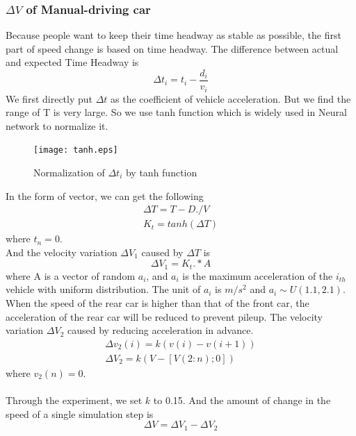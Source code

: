 \documentclass[UTF8]{mcmthesis}
\begin{document}
\subsubsection{$\Delta V$ of Manual-driving car}
Because people want to keep their time headway as stable as possible, the first part of speed change is based on time headway. The difference between actual and expected Time Headway is
\begin{equation}
	\Delta t_{i}=t_{i}-\frac{d_{i}}{v_{i}}
\end{equation}
\indent We first directly put $\Delta t$ as the coefficient of vehicle acceleration. But we find the range of T is very large. So we use tanh function which is widely used in Neural network to normalize it.\\
\begin{figure}[H]
	\centerline{\texttt{[image: tanh.eps]}}
	\caption{Normalization of $\Delta t_{i}$ by tanh function}
\end{figure}
\indent In the form of vector, we can get the following
\begin{equation}
\begin{split}
	\Delta T=T-D./V\\
	K_{t}= tanh(\Delta T) 
\end{split}
\end{equation}
where $t_n=0$.\\
\indent And the velocity variation $\Delta V_{1}$ caused by $\Delta T$ is
\begin{equation}
	\Delta V_{1}=K_{t}.*A
\end{equation}
\indent where A is a vector of random $a_{i}$, and $a_{i}$ is the maximum acceleration of the $i_{th}$ vehicle with uniform distribution. The unit of $a_{i}$ is $m/s^{2}$ and $a_{i}\sim U(1.1,2.1)$.\\
\indent When the speed of the rear car is higher than that of the front car, the acceleration of the rear car will be reduced to prevent pileup. The velocity variation $\Delta V_{2}$ caused by reducing acceleration in advance.
\begin{equation}
\begin{split}
	\Delta v_{2}(i)=k(v(i)-v(i+1))\\
	\Delta V_{2}=k(V-[V(2:n);0])
\end{split}
\end{equation}
where $v_2(n)=0$.\\
\\Through the experiment, we set $k$ to 0.15. And the amount of change in the speed of a single simulation step is
\begin{equation}
\Delta V=\Delta V_1-\Delta V_2
\end{equation}
\end{document}
